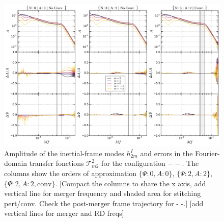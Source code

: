 \documentclass[aps,showpacs,twocolumn,
prd,superscriptaddress,nofootinbib]{revtex4-1}
\newcommand\calT{{\mathcal{T}}}
\newcommand{\SM}[1]{{\color{Red} #1}}
\begin{document}
\begin{figure}
  \centering
  \includegraphics[width=.98\linewidth]{plots/precerror_--_py.pdf}
  \caption{Amplitude of the inertial-frame modes $h^{I}_{2m}$ and errors in the Fourier-domain transfer fonctions $\calT^{2}_{m2}$ for the configuration $--$. The columns show the orders of approximation $\{\Psi:0,A:0\}$, $\{\Psi:2,A:2\}$, $\{\Psi:2,A:2,\text{conv}\}$. \SM{[Compact the columns to share the x axis, add vertical line for merger frequency and shaded area for stitching pert/conv. Check the post-merger frame trajectory for - -.]} \SM{[add vertical lines for merger and RD freqs]}}
  \label{fig:precerrors--}
\end{figure}

\end{document}
